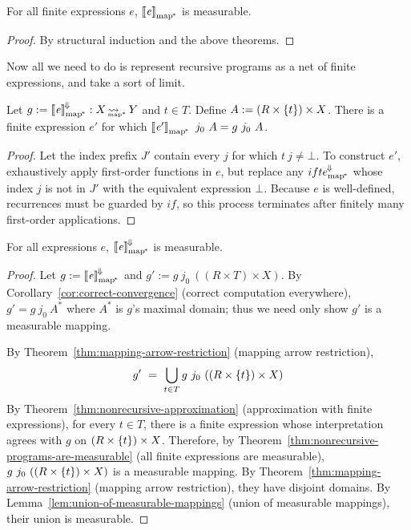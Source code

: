 \begin{theorem}
\label{thm:nonrecursive-programs-are-measurable}
For all finite expressions $\mathit{e}$, $\left\llbracket{\mathit{e}}\right\rrbracket_\mathrm{map^{\mspace{-2mu}*}}$ is measurable.%
\end{theorem}
\begin{proof}
By structural induction and the above theorems.
\end{proof}

Now all we need to do is represent recursive programs as a net of finite expressions, and take a sort of limit.

\begin{theorem}
\label{thm:nonrecursive-approximation}
Let $g := \left\llbracket{\mathit{e}}\right\rrbracket^{\mspace{-2mu}\Downarrow\mspace{-2mu}}_\mathrm{map^{\mspace{-2mu}*}} : X \operatorname{\rightsquigarrow_{\mspace{-22mu}_{\mathrm{map*}}}} Y$ and $t \in T$.
Define $A := (R \times \{{t}\}) \times X$.
There is a finite expression $\mathit{e'}$ for which $\left\llbracket{\mathit{e'}}\right\rrbracket_\mathrm{map^{\mspace{-2mu}*}}~j_0~A = g~j_0~A$.%
\end{theorem}
\begin{proof}
Let the index prefix $J'$ contain every $j$ for which $t~j \neq \bot$.
To construct $\mathit{e'}$, exhaustively apply first-order functions in $\mathit{e}$, but replace any $ifte^{\mspace{-2mu}\Downarrow\mspace{-2mu}}_\mathrm{map^{\mspace{-2mu}*}}$ whose index $j$ is not in $J'$ with the equivalent expression $\bot$.
Because $\mathit{e}$ is well-defined, recurrences must be guarded by $if$, so this process terminates after finitely many first-order applications.
\end{proof}

\begin{theorem}
\label{thm:everything-is-measurable}
For all expressions $\mathit{e}$, $\left\llbracket{\mathit{e}}\right\rrbracket^{\mspace{-2mu}\Downarrow\mspace{-2mu}}_\mathrm{map^{\mspace{-2mu}*}}$ is measurable.%
\end{theorem}
\begin{proof}
Let $g := \left\llbracket{\mathit{e}}\right\rrbracket^{\mspace{-2mu}\Downarrow\mspace{-2mu}}_\mathrm{map^{\mspace{-2mu}*}}$ and $g' := g~j_0~((R \times T) \times X)$.
By Corollary~\ref{cor:correct-convergence} (correct computation everywhere), $g' = g~j_0~A^*$ where $A^*$ is $g$'s maximal domain; thus we need only show $g'$ is a measurable mapping.

By Theorem~\ref{thm:mapping-arrow-restriction} (mapping arrow restriction),
\begin{equation}
	g' \ =\ \bigcup\limits_{t \in T} g~j_0~((R \times \set{t}) \times X)
\end{equation}
By Theorem~\ref{thm:nonrecursive-approximation} (approximation with finite expressions), for every $t \in T$, there is a finite expression whose interpretation agrees with $g$ on $(R \times \{{t}\}) \times X$.
Therefore, by Theorem~\ref{thm:nonrecursive-programs-are-measurable} (all finite expressions are measurable), $g~j_0~((R \times \{{t}\}) \times X)$ is a measurable mapping.
By Theorem~\ref{thm:mapping-arrow-restriction} (mapping arrow restriction), they have disjoint domains.
By Lemma~\ref{lem:union-of-measurable-mappings} (union of measurable mappings), their union is measurable.
\end{proof}

